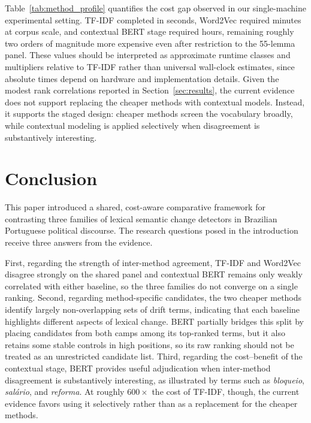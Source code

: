 \documentclass[12pt]{article}
\begin{document}
Table~\ref{tab:method_profile} quantifies the cost gap observed in our single-machine experimental setting. TF-IDF completed in seconds, Word2Vec required minutes at corpus scale, and contextual BERT stage required hours, remaining roughly two orders of magnitude more expensive even after restriction to the 55-lemma panel. These values should be interpreted as approximate runtime classes and multipliers relative to TF-IDF rather than universal wall-clock estimates, since absolute times depend on hardware and implementation details. Given the modest rank correlations reported in Section~\ref{sec:results}, the current evidence does not support replacing the cheaper methods with contextual models. Instead, it supports the staged design: cheaper methods screen the vocabulary broadly, while contextual modeling is applied selectively when disagreement is substantively interesting.


\section{Conclusion}
\label{sec:conclusion}

This paper introduced a shared, cost-aware comparative framework for contrasting three families of lexical semantic change detectors in Brazilian Portuguese political discourse. The research questions posed in the
introduction receive three answers from the evidence.

First, regarding the strength of inter-method
agreement, TF-IDF and Word2Vec disagree strongly on the shared panel and contextual BERT remains only weakly
correlated with either baseline, so the three families do not converge on a single ranking.
Second, regarding method-specific candidates, %
the two cheaper methods identify largely non-overlapping sets of drift terms, indicating that each baseline highlights different aspects of lexical change.
BERT partially bridges
this split by placing candidates from both camps among its top-ranked terms,
but it also retains some stable controls in high positions, so its raw ranking
should not be treated as an unrestricted candidate list. Third, regarding the
cost--benefit of the contextual stage, BERT provides useful adjudication when
inter-method disagreement is substantively interesting, as illustrated by
terms such as \textit{bloqueio}, \textit{sal\'ario}, and \textit{reforma}.
At roughly $600{\times}$ the cost of TF-IDF, though, the current evidence
favors using it selectively rather than as a replacement for the cheaper
methods. 
\end{document}
